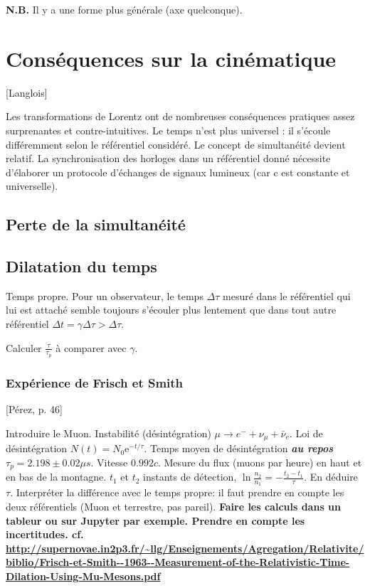 \documentclass[11pt]{report}
\numberwithin{figure}{section}
\numberwithin{equation}{section}
\numberwithin{table}{section}
\newcommand{\e}{\mathrm{e}}
\newcommand{\1}{\boldsymbol{1}}
\begin{document}
\textbf{N.B.} Il y a une forme plus générale (axe quelconque).


\section{Conséquences sur la cinématique}

[Langlois]

Les transformations de Lorentz ont de nombreuses conséquences pratiques assez surprenantes et contre-intuitives. Le temps n’est plus universel : il s’écoule différemment selon le référentiel considéré. Le concept de simultanéité devient relatif. La synchronisation des horloges dans un référentiel
donné nécessite d’élaborer un protocole d’échanges de signaux lumineux (car c est constante et universelle).

\subsection{Perte de la simultanéité}


\subsection{Dilatation du temps}

Temps propre. Pour un observateur, le temps $\Delta \tau$ mesuré dans le référentiel qui lui est attaché semble toujours
s’écouler plus lentement que dans tout autre référentiel $\Delta t = \gamma \Delta \tau > \Delta \tau$.

Calculer $\frac{\tau}{\tau_p}$ à comparer avec $\gamma$.

\subsubsection{Expérience de Frisch et Smith}


[Pérez, p. 46] 

Introduire le Muon. Instabilité (désintégration) $\mu \rightarrow e^- + \nu_\mu + \bar{\nu}_e$. Loi de désintégration $N(t) = N_0 \e^{-t/\tau}$. Temps moyen de désintégration \textbf{\emph{au repos}} $\tau_p = 2.198 \pm 0.02 \mu s$. Vitesse $0.992c$. Mesure du flux (muons par heure) en haut et en bas de la montagne. $t_1$ et $t_2$ instants de détection, $\ln \frac{n_2}{n_1} = - \frac{t_2 - t_1}{\tau}$. En déduire $\tau$. Interpréter la différence avec le temps propre: il faut prendre en compte les deux référentiels (Muon et terrestre, pas pareil). \textbf{Faire les calculs dans un tableur ou sur Jupyter par exemple. Prendre en compte les incertitudes. cf. \url{http://supernovae.in2p3.fr/~llg/Enseignements/Agregation/Relativite/biblio/Frisch-et-Smith--1963--Measurement-of-the-Relativistic-Time-Dilation-Using-Mu-Mesons.pdf}}
\end{document}
